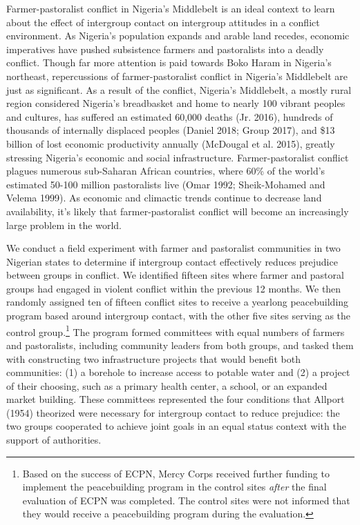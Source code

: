 \documentclass[11pt]{article}
\begin{document}
Farmer-pastoralist conflict in Nigeria's Middlebelt is an ideal context
to learn about the effect of intergroup contact on intergroup attitudes
in a conflict environment. As Nigeria's population expands and arable
land recedes, economic imperatives have pushed subsistence farmers and
pastoralists into a deadly conflict. Though far more attention is paid
towards Boko Haram in Nigeria's northeast, repercussions of
farmer-pastoralist conflict in Nigeria's Middlebelt are just as
significant. As a result of the conflict, Nigeria's Middlebelt, a mostly
rural region considered Nigeria's breadbasket and home to nearly 100
vibrant peoples and cultures, has suffered an estimated 60,000 deaths
(Jr. 2016), hundreds of thousands of internally displaced peoples
(Daniel 2018; Group 2017), and \$13 billion of lost economic
productivity annually (McDougal et al. 2015), greatly stressing
Nigeria's economic and social infrastructure. Farmer-pastoralist
conflict plagues numerous sub-Saharan African countries, where 60\% of
the world's estimated 50-100 million pastoralists live (Omar 1992;
Sheik-Mohamed and Velema 1999). As economic and climactic trends
continue to decrease land availability, it's likely that
farmer-pastoralist conflict will become an increasingly large problem in
the world.

We conduct a field experiment with farmer and pastoralist communities in
two Nigerian states to determine if intergroup contact effectively
reduces prejudice between groups in conflict. We identified fifteen
sites where farmer and pastoral groups had engaged in violent conflict
within the previous 12 months. We then randomly assigned ten of fifteen
conflict sites to receive a yearlong peacebuilding program based around
intergroup contact, with the other five sites serving as the control
group.\footnote{Based on the success of ECPN, Mercy Corps received
  further funding to implement the peacebuilding program in the control
  sites \emph{after} the final evaluation of ECPN was completed. The
  control sites were not informed that they would receive a
  peacebuilding program during the evaluation.} The program formed
committees with equal numbers of farmers and pastoralists, including
community leaders from both groups, and tasked them with constructing
two infrastructure projects that would benefit both communities: (1) a
borehole to increase access to potable water and (2) a project of their
choosing, such as a primary health center, a school, or an expanded
market building. These committees represented the four conditions that
Allport (1954) theorized were necessary for intergroup contact to reduce
prejudice: the two groups cooperated to achieve joint goals in an equal
status context with the support of authorities.
\end{document}
